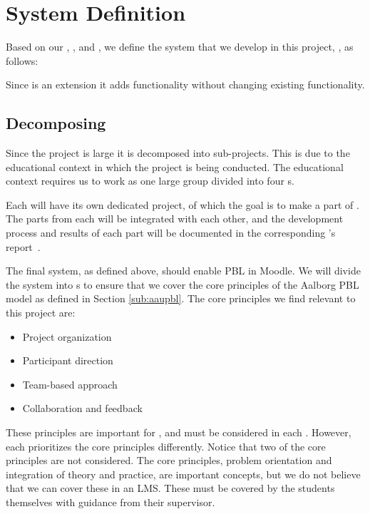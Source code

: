 \chapter{System Definition}
\label{sec:systemDef}
\label{chap:systemDef}
Based on our , , and , we define the system that we develop in this project, \system{}, as follows:


Since \system{} is an extension it adds functionality without changing existing functionality.


\section{Decomposing \system}
\label{sub:decomposingSys}
Since the project is large it is decomposed into sub-projects.
This is due to the educational context in which the project is being conducted.
The educational context requires us to work as one large group divided into four \subgroup{}s.

Each \subgroup{} will have its own dedicated project, of which the goal is to make a part of \system{}.
The parts from each \subgroup{} will be integrated with each other, and the development process and results of each part will be documented in the corresponding \subgroup{}'s report~\cite{sw6studieordning}.

The final system, as defined above, should enable PBL in Moodle.
We will divide the system into \subsystem{}s to ensure that we cover the core principles of the Aalborg PBL model as defined in Section \ref{sub:aaupbl}.
The core principles we find relevant to this project are:

\begin{itemize}
    \item Project organization
    \item Participant direction
    \item Team-based approach
    \item Collaboration and feedback
\end{itemize}

These principles are important for \system{}, and must be considered in each \subsystem{}.
However, each \subsystem{} prioritizes the core principles differently.
Notice that two of the core principles are not considered.
The core principles, problem orientation and integration of theory and practice, are important concepts, but we do not believe that we can cover these in an LMS.
These must be covered by the students themselves with guidance from their supervisor.

